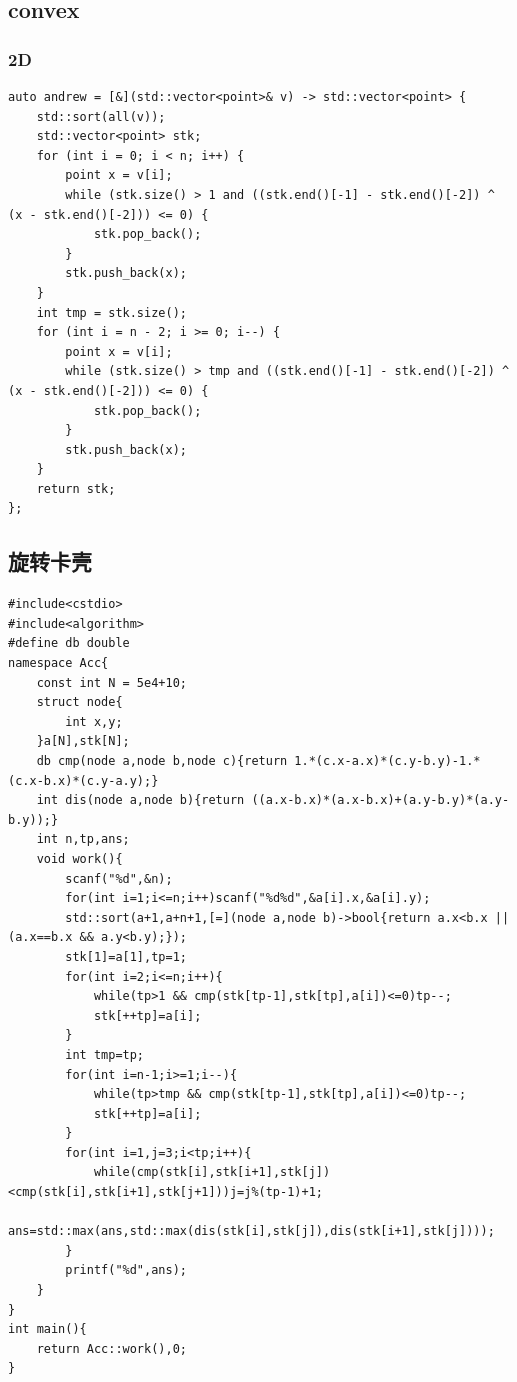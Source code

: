 \documentclass[UTF8, a4paper, titlepage, twoside]{ctexart}
\begin{document}
\subsection{ convex }
\subsubsection*{ 2D }
\begin{lstlisting}[style=cpp]
auto andrew = [&](std::vector<point>& v) -> std::vector<point> {
    std::sort(all(v));
    std::vector<point> stk;
    for (int i = 0; i < n; i++) {
        point x = v[i];
        while (stk.size() > 1 and ((stk.end()[-1] - stk.end()[-2]) ^ (x - stk.end()[-2])) <= 0) {
            stk.pop_back();
        }
        stk.push_back(x);
    }
    int tmp = stk.size();
    for (int i = n - 2; i >= 0; i--) {
        point x = v[i];
        while (stk.size() > tmp and ((stk.end()[-1] - stk.end()[-2]) ^ (x - stk.end()[-2])) <= 0) {
            stk.pop_back();
        }
        stk.push_back(x);
    }
    return stk;
};
\end{lstlisting}

\subsection*{ 旋转卡壳 }
\begin{lstlisting}[style=cpp]
#include<cstdio>
#include<algorithm>
#define db double
namespace Acc{
    const int N = 5e4+10;
    struct node{
        int x,y;
    }a[N],stk[N];
    db cmp(node a,node b,node c){return 1.*(c.x-a.x)*(c.y-b.y)-1.*(c.x-b.x)*(c.y-a.y);}
    int dis(node a,node b){return ((a.x-b.x)*(a.x-b.x)+(a.y-b.y)*(a.y-b.y));}
    int n,tp,ans;
    void work(){
        scanf("%d",&n);
        for(int i=1;i<=n;i++)scanf("%d%d",&a[i].x,&a[i].y);
        std::sort(a+1,a+n+1,[=](node a,node b)->bool{return a.x<b.x || (a.x==b.x && a.y<b.y);});
        stk[1]=a[1],tp=1;
        for(int i=2;i<=n;i++){
            while(tp>1 && cmp(stk[tp-1],stk[tp],a[i])<=0)tp--;
            stk[++tp]=a[i];
        }
        int tmp=tp;
        for(int i=n-1;i>=1;i--){
            while(tp>tmp && cmp(stk[tp-1],stk[tp],a[i])<=0)tp--;
            stk[++tp]=a[i];
        }
        for(int i=1,j=3;i<tp;i++){
            while(cmp(stk[i],stk[i+1],stk[j])<cmp(stk[i],stk[i+1],stk[j+1]))j=j%(tp-1)+1;
            ans=std::max(ans,std::max(dis(stk[i],stk[j]),dis(stk[i+1],stk[j])));
        }
        printf("%d",ans);
    }
}
int main(){
    return Acc::work(),0;
}
\end{lstlisting}
\end{document}
